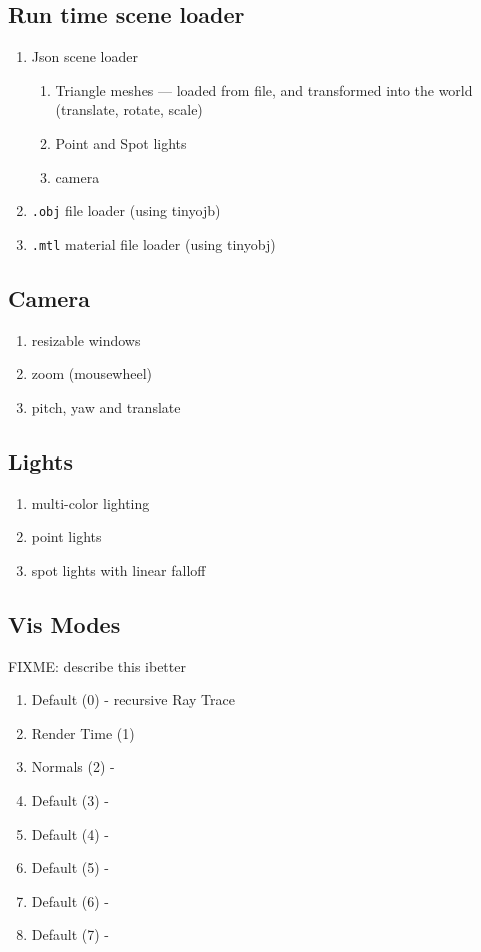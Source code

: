 \subsection{Run time scene loader}
    \begin{enumerate}
    \item Json scene loader
        \begin{enumerate}
        \item Triangle meshes --- loaded from file, and transformed into the world (translate, rotate, scale)
        \item Point and Spot lights
        \item camera
        \end{enumerate}
    \item \verb|.obj| file loader (using tinyojb)
    \item \verb|.mtl| material file loader (using tinyobj)
    \end{enumerate}

\subsection{Camera}
    \begin{enumerate}
    \item resizable windows
    \item zoom (mousewheel)
    \item pitch, yaw and translate
    \end{enumerate}

\subsection{Lights}
    \begin{enumerate}
    \item multi-color lighting
    \item point lights
    \item spot lights with linear falloff
    \end{enumerate}

\subsection{Vis Modes}
            FIXME: describe this ibetter
    \begin{enumerate}
    \item Default (0) - recursive Ray Trace
    \item Render Time (1)
    \item Normals (2) - 
    \item Default (3) - 
    \item Default (4) - 
    \item Default (5) -
    \item Default (6) - 
    \item Default (7) -
    \end{enumerate}

